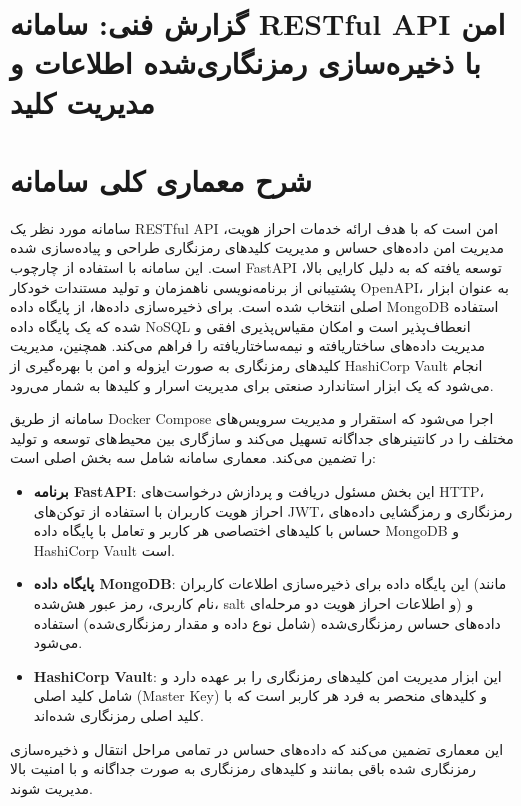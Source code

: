 \documentclass[a4paper,12pt]{article}
\begin{document}
\onehalfspacing

\section*{گزارش فنی: سامانه RESTful API امن با ذخیره‌سازی رمزنگاری‌شده اطلاعات و مدیریت کلید}

\section{شرح معماری کلی سامانه}
سامانه مورد نظر یک RESTful API امن است که با هدف ارائه خدمات احراز هویت، مدیریت امن داده‌های حساس و مدیریت کلیدهای رمزنگاری طراحی و پیاده‌سازی شده است. این سامانه با استفاده از چارچوب FastAPI توسعه یافته که به دلیل کارایی بالا، پشتیبانی از برنامه‌نویسی ناهمزمان و تولید مستندات خودکار OpenAPI، به عنوان ابزار اصلی انتخاب شده است. برای ذخیره‌سازی داده‌ها، از پایگاه داده MongoDB استفاده شده که یک پایگاه داده NoSQL انعطاف‌پذیر است و امکان مقیاس‌پذیری افقی و مدیریت داده‌های ساختاریافته و نیمه‌ساختاریافته را فراهم می‌کند. همچنین، مدیریت کلیدهای رمزنگاری به صورت ایزوله و امن با بهره‌گیری از HashiCorp Vault انجام می‌شود که یک ابزار استاندارد صنعتی برای مدیریت اسرار و کلیدها به شمار می‌رود.

سامانه از طریق Docker Compose اجرا می‌شود که استقرار و مدیریت سرویس‌های مختلف را در کانتینرهای جداگانه تسهیل می‌کند و سازگاری بین محیط‌های توسعه و تولید را تضمین می‌کند. معماری سامانه شامل سه بخش اصلی است:
\begin{itemize}
    \item \textbf{برنامه FastAPI}: این بخش مسئول دریافت و پردازش درخواست‌های HTTP، احراز هویت کاربران با استفاده از توکن‌های JWT، رمزنگاری و رمزگشایی داده‌های حساس با کلیدهای اختصاصی هر کاربر و تعامل با پایگاه داده MongoDB و HashiCorp Vault است.
    \item \textbf{پایگاه داده MongoDB}: این پایگاه داده برای ذخیره‌سازی اطلاعات کاربران (مانند نام کاربری، رمز عبور هش‌شده، salt و اطلاعات احراز هویت دو مرحله‌ای) و داده‌های حساس رمزنگاری‌شده (شامل نوع داده و مقدار رمزنگاری‌شده) استفاده می‌شود.
    \item \textbf{HashiCorp Vault}: این ابزار مدیریت امن کلیدهای رمزنگاری را بر عهده دارد و شامل کلید اصلی (Master Key) و کلیدهای منحصر به فرد هر کاربر است که با کلید اصلی رمزنگاری شده‌اند.
\end{itemize}
این معماری تضمین می‌کند که داده‌های حساس در تمامی مراحل انتقال و ذخیره‌سازی رمزنگاری شده باقی بمانند و کلیدهای رمزنگاری به صورت جداگانه و با امنیت بالا مدیریت شوند.
\end{document}
